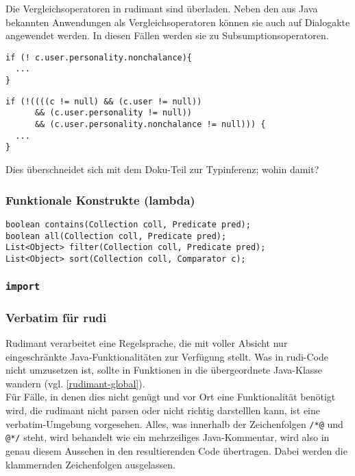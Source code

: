 Die Vergleichsoperatoren in rudimant sind überladen. Neben den aus Java bekannten Anwendungen als Vergleichsoperatoren können sie auch auf Dialogakte angewendet werden. In diesen Fällen werden sie zu Subsumptionsoperatoren.

\begin{small}
\begin{minipage}{0.4\textwidth}
\begin{verbatim}
if (! c.user.personality.nonchalance){
  ...
}
\end{verbatim}
\end{minipage}
\begin{minipage}{0.6\textwidth}
\begin{verbatim}
if (!((((c != null) && (c.user != null))
      && (c.user.personality != null))
      && (c.user.personality.nonchalance != null))) {
  ...
}
\end{verbatim}
\end{minipage}
\end{small}

Dies überschneidet sich mit dem Doku-Teil zur Typinferenz; wohin damit?

\subsubsection{Funktionale Konstrukte (lambda)}

\begin{small}
\begin{verbatim}
boolean contains(Collection coll, Predicate pred);
boolean all(Collection coll, Predicate pred);
List<Object> filter(Collection coll, Predicate pred);
List<Object> sort(Collection coll, Comparator c);
\end{verbatim}
\end{small}

\subsubsection{\texttt{import}}

\subsubsection{Verbatim für rudi} \label{rudi-verbatim}

Rudimant verarbeitet eine Regelsprache, die mit voller Absicht nur eingeschränkte Java-Funktionalitäten zur Verfügung stellt. Was in rudi-Code nicht umzusetzen ist, sollte in Funktionen in die übergeordnete Java-Klasse wandern (vgl. \ref{rudimant-global}).\\
Für Fälle, in denen dies nicht genügt und vor Ort eine Funktionalität benötigt wird, die rudimant nicht parsen oder nicht richtig darstelllen kann, ist eine verbatim-Umgebung vorgesehen. Alles, was innerhalb der Zeichenfolgen \verb|/*@| und \verb|@*/| steht, wird behandelt wie ein mehrzeiliges Java-Kommentar, wird also in genau diesem Aussehen in den resultierenden Code übertragen. Dabei werden die klammernden Zeichenfolgen ausgelassen.


